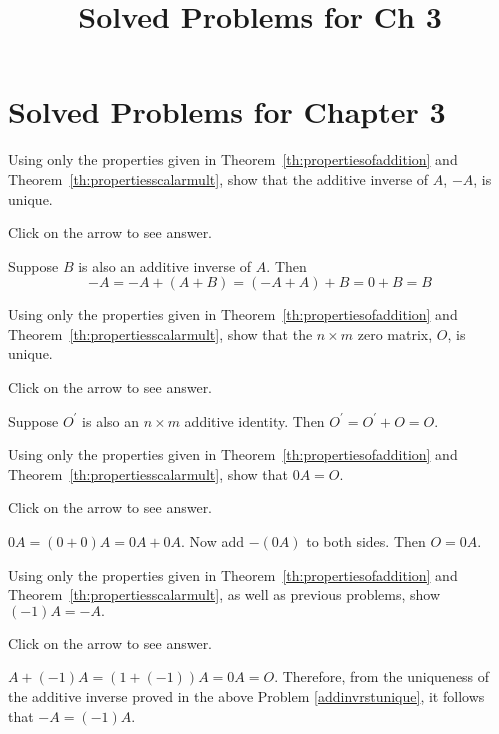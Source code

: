 \documentclass{ximera}
\title{Solved Problems for Ch 3} \license{CC BY-NC-SA 4.0}
\begin{document}
\begin{abstract}
\end{abstract}
\maketitle

\section*{Solved Problems for Chapter 3}

\begin{problem}\label{prb:4.5} Using only the properties given in Theorem~\ref{th:propertiesofaddition}
 and Theorem~\ref{th:propertiesscalarmult},
show that the additive inverse of $A$, $-A$, is unique.

Click on the arrow to see answer.
\begin{expandable}
 Suppose $B$ is also an additive inverse of $A$. Then
\[
-A=-A+\left( A+B\right) =\left( -A+A\right) +B=0+B=B
\]
\end{expandable}
\end{problem}

\begin{problem}\label{prb:4.6} Using only the properties given in Theorem~\ref{th:propertiesofaddition}
 and Theorem~\ref{th:propertiesscalarmult},
show that the $n\times m$ zero matrix, $O$, is unique.

Click on the arrow to see answer.
\begin{expandable}
Suppose $O^{\prime }$ is also an $n\times m$ additive identity. Then $O^{\prime }=O^{\prime }+O=O.$
\end{expandable}
\end{problem}

\begin{problem}\label{prb:4.7} Using only the properties given in Theorem~\ref{th:propertiesofaddition}
 and Theorem~\ref{th:propertiesscalarmult}, show that $0A=O.$ 

Click on the arrow to see answer.
\begin{expandable}
$0A=\left( 0+0\right) A=0A+0A.$ Now add $-\left(
0A\right) $ to both sides. Then $O=0A$.
\end{expandable}
\end{problem}

\begin{problem}\label{prb:4.8} Using only the properties given in Theorem~\ref{th:propertiesofaddition}
 and Theorem~\ref{th:propertiesscalarmult}, as well as previous
problems, show $\left( -1\right) A=-A.$

Click on the arrow to see answer.
\begin{expandable}
$A+\left( -1\right) A=\left( 1+\left(
-1\right) \right) A=0A=O.$ Therefore, from the uniqueness of the additive
inverse proved in the above Problem \ref{addinvrstunique}, it follows that $
-A=\left( -1\right) A$.
\end{expandable}
\end{problem}
\end{document}
